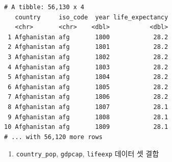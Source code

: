 \documentclass[
  11pt,
]{krantz}
\newenvironment{Shaded}{\begin{snugshade}}{\end{snugshade}}
\newcommand{\DataTypeTok}[1]{\textcolor[rgb]{0.27,0.27,0.27}{#1}}
\newcommand{\KeywordTok}[1]{\textcolor[rgb]{0.27,0.27,0.27}{\textbf{#1}}}
\newcommand{\NormalTok}[1]{#1}
\newcommand{\OperatorTok}[1]{\textcolor[rgb]{0.43,0.43,0.43}{\textbf{#1}}}
\newcommand{\StringTok}[1]{\textcolor[rgb]{0.5,0.5,0.5}{#1}}
\providecommand{\tightlist}{%
  \setlength{\itemsep}{0pt}\setlength{\parskip}{0pt}}
\begin{document}
\begin{Shaded}
\end{Shaded}

\begin{verbatim}
# A tibble: 56,130 x 4
   country     iso_code  year life_expectancy
   <chr>       <chr>    <dbl>           <dbl>
 1 Afghanistan afg       1800            28.2
 2 Afghanistan afg       1801            28.2
 3 Afghanistan afg       1802            28.2
 4 Afghanistan afg       1803            28.2
 5 Afghanistan afg       1804            28.2
 6 Afghanistan afg       1805            28.2
 7 Afghanistan afg       1806            28.2
 8 Afghanistan afg       1807            28.1
 9 Afghanistan afg       1808            28.1
10 Afghanistan afg       1809            28.1
# ... with 56,120 more rows
\end{verbatim}

\normalsize

\begin{enumerate}
\def\labelenumi{\arabic{enumi}.}
\setcounter{enumi}{1}
\tightlist
\item
  \texttt{country\_pop}, \texttt{gdpcap}, \texttt{lifeexp} 데이터 셋 결합
\end{enumerate}

\footnotesize

\begin{Shaded}
\end{Shaded}
\end{document}
